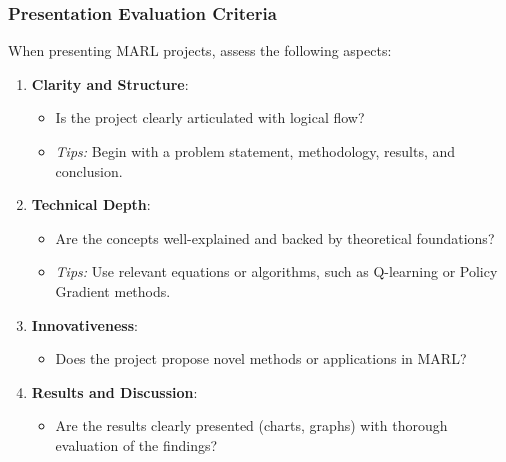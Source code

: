 \documentclass[aspectratio=169]{beamer}
\begin{document}
\begin{frame}[fragile]
    \frametitle{Presentation Evaluation Criteria}
    When presenting MARL projects, assess the following aspects:
    
    \begin{enumerate}
        \item \textbf{Clarity and Structure}:
            \begin{itemize}
                \item Is the project clearly articulated with logical flow?
                \item \textit{Tips:} Begin with a problem statement, methodology, results, and conclusion.
            \end{itemize}
        
        \item \textbf{Technical Depth}:
            \begin{itemize}
                \item Are the concepts well-explained and backed by theoretical foundations?
                \item \textit{Tips:} Use relevant equations or algorithms, such as Q-learning or Policy Gradient methods.
            \end{itemize}
        
        \item \textbf{Innovativeness}:
            \begin{itemize}
                \item Does the project propose novel methods or applications in MARL?
            \end{itemize}
        
        \item \textbf{Results and Discussion}:
            \begin{itemize}
                \item Are the results clearly presented (charts, graphs) with thorough evaluation of the findings?
            \end{itemize}
    \end{enumerate}
\end{frame}
\end{document}
